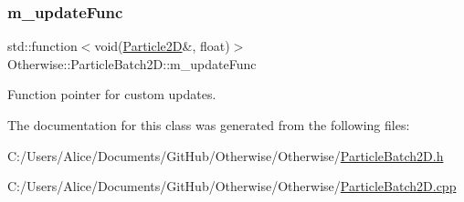 \mbox{\label{class_otherwise_1_1_particle_batch2_d_a6eed0d4ded677fb9044e03f295a6d277}} 
\subsubsection{\texorpdfstring{m\+\_\+update\+Func}{m\_updateFunc}}
{\footnotesize\ttfamily std\+::function$<$void(\hyperlink{class_otherwise_1_1_particle2_d}{Particle2D}\&, float)$>$ Otherwise\+::\+Particle\+Batch2\+D\+::m\+\_\+update\+Func\hspace{0.3cm}{\ttfamily [private]}}



Function pointer for custom updates. 



The documentation for this class was generated from the following files\+:\begin{DoxyCompactItemize}
\item 
C\+:/\+Users/\+Alice/\+Documents/\+Git\+Hub/\+Otherwise/\+Otherwise/\hyperlink{_particle_batch2_d_8h}{Particle\+Batch2\+D.\+h}\item 
C\+:/\+Users/\+Alice/\+Documents/\+Git\+Hub/\+Otherwise/\+Otherwise/\hyperlink{_particle_batch2_d_8cpp}{Particle\+Batch2\+D.\+cpp}\end{DoxyCompactItemize}
